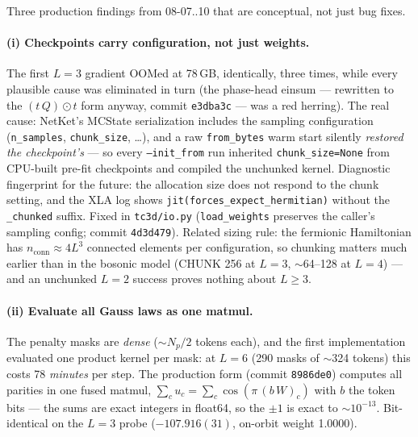\documentclass[11pt]{article}
\newcommand{\file}[1]{\texttt{#1}}
\begin{document}
Three production findings from 08-07..10 that are conceptual, not just
bug fixes.

\paragraph{(i) Checkpoints carry configuration, not just weights.}
The first $L=3$ gradient OOMed at 78\,GB, identically, three times, while
every plausible cause was eliminated in turn (the phase-head einsum ---
rewritten to the $(t\,Q)\odot t$ form anyway, commit \texttt{e3dba3c} --- was a
red herring). The real cause: NetKet's MCState serialization includes the
sampling configuration (\texttt{n\_samples}, \texttt{chunk\_size}, \dots), and
a raw \texttt{from\_bytes} warm start silently \emph{restored the
checkpoint's} --- so every \texttt{--init\_from} run inherited
\texttt{chunk\_size=None} from CPU-built pre-fit checkpoints and compiled the
unchunked kernel. Diagnostic fingerprint for the future: the allocation size
does not respond to the chunk setting, and the XLA log shows
\texttt{jit(forces\_expect\_hermitian)} without the \texttt{\_chunked}
suffix. Fixed in \file{tc3d/io.py} (\texttt{load\_weights} preserves the
caller's sampling config; commit \texttt{4d3d479}). Related sizing rule: the
fermionic Hamiltonian has $n_{\mathrm{conn}}\approx4L^3$ connected elements
per configuration, so chunking matters much earlier than in the bosonic
model (CHUNK 256 at $L=3$, $\sim$64--128 at $L=4$) --- and an unchunked $L=2$
success proves nothing about $L\ge3$.

\paragraph{(ii) Evaluate all Gauss laws as one matmul.}
The penalty masks are \emph{dense} ($\sim N_p/2$ tokens each), and the first
implementation evaluated one product kernel per mask: at $L=6$ (290 masks of
$\sim$324 tokens) this costs 78 \emph{minutes} per step. The production form
(commit \texttt{8986de0}) computes all parities in one fused matmul,
$\sum_c u_c = \sum_c\cos(\pi\,(b\,W)_c)$ with $b$ the token bits --- the sums
are exact integers in float64, so the $\pm1$ is exact to $\sim10^{-13}$.
Bit-identical on the $L=3$ probe ($-107.916(31)$, on-orbit weight 1.0000).
\end{document}
